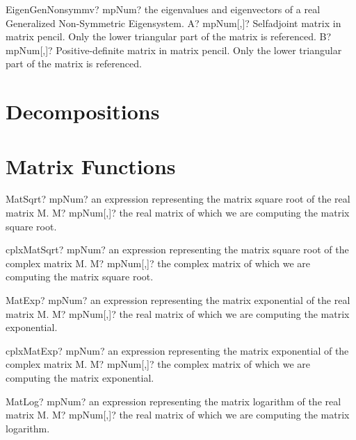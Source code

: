 \documentclass[12pt,a4paper,openany]{book}
\begin{document}
\begin{mpFunctionsExtract}
\mpFunctionTwo
{EigenGenNonsymmv? mpNum? the eigenvalues and eigenvectors of a real Generalized Non-Symmetric Eigensystem.}
{A? mpNum[,]? Selfadjoint matrix in matrix pencil. Only the lower triangular part of the matrix is referenced.}
{B? mpNum[,]? Positive-definite matrix in matrix pencil. Only the lower triangular part of the matrix is referenced.}
\end{mpFunctionsExtract}

\section{Decompositions}

\section{Matrix Functions}

\begin{mpFunctionsExtract}
\mpFunctionOne
{MatSqrt? mpNum? an expression representing the matrix square root of the real matrix M.}
{M? mpNum[,]? the real matrix of which we are computing the matrix square root.}
\end{mpFunctionsExtract}

\begin{mpFunctionsExtract}
\mpFunctionOne
{cplxMatSqrt? mpNum? an expression representing the matrix square root of the complex matrix M.}
{M? mpNum[,]? the complex matrix of which we are computing the matrix square root.}
\end{mpFunctionsExtract}

\begin{mpFunctionsExtract}
\mpFunctionOne
{MatExp? mpNum? an expression representing the matrix exponential of the real matrix M.}
{M? mpNum[,]? the real matrix of which we are computing the matrix exponential.}
\end{mpFunctionsExtract}

\begin{mpFunctionsExtract}
\mpFunctionOne
{cplxMatExp? mpNum? an expression representing the matrix exponential of the complex matrix M.}
{M? mpNum[,]? the complex matrix of which we are computing the matrix exponential.}
\end{mpFunctionsExtract}

\begin{mpFunctionsExtract}
\mpFunctionOne
{MatLog? mpNum? an expression representing the matrix logarithm of the real matrix M.}
{M? mpNum[,]? the real matrix of which we are computing the matrix logarithm.}
\end{mpFunctionsExtract}
\end{document}
